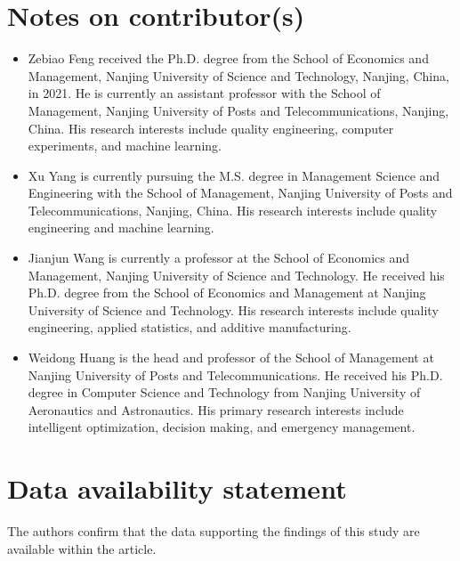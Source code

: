 \documentclass[]{interact}
\theoremstyle{plain}%
\theoremstyle{definition}
\theoremstyle{remark}
\begin{document}
\section*{Notes on contributor(s)}
\begin{itemize}
 \item Zebiao Feng received the Ph.D. degree from the School of Economics and Management, Nanjing University of Science and Technology, Nanjing, China, in 2021. He is currently an assistant professor with the School of Management, Nanjing University of Posts and Telecommunications, Nanjing, China. His research interests include quality engineering, computer experiments, and machine learning.

 \item Xu Yang is currently pursuing the M.S. degree in Management Science and Engineering with the School of Management, Nanjing University of Posts and Telecommunications, Nanjing, China. His research interests include quality engineering and machine learning.
 
 \item Jianjun Wang is currently a professor at the School of Economics and Management, Nanjing University of Science and Technology. He received his Ph.D. degree from the School of Economics and Management at Nanjing University of Science and Technology. His research interests include quality engineering, applied statistics, and additive manufacturing.

 \item Weidong Huang is the head and professor of the School of Management at Nanjing University of Posts and Telecommunications. He received his Ph.D. degree in Computer Science and Technology from Nanjing University of Aeronautics and Astronautics. His primary research interests include intelligent optimization, decision making, and emergency management.
\end{itemize}

\section*{Data availability statement}

The authors confirm that the data supporting the findings of this study are available within the article.
\end{document}
